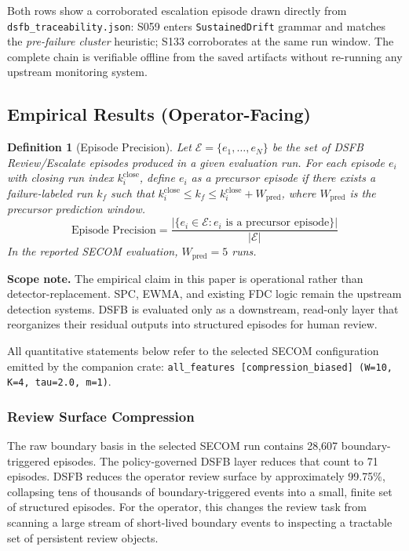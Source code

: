 \documentclass[11pt,letterpaper]{article}
\theoremstyle{scresult}
\newtheorem{definition}{Definition}
\begin{document}
\noindent Both rows show a corroborated escalation episode drawn directly
from \texttt{dsfb\_traceability.json}: S059
enters \texttt{SustainedDrift} grammar and matches the
\emph{pre-failure cluster} heuristic; S133 corroborates at the same run
window.
The complete chain is verifiable offline from the saved artifacts without
re-running any upstream monitoring system.

\subsection{Empirical Results (Operator-Facing)}

\begin{definition}[Episode Precision]
Let $\mathcal{E} = \{e_1, \ldots, e_N\}$ be the set of DSFB
Review/Escalate episodes produced in a given evaluation run. For each episode
$e_i$ with closing run index $k_i^{\text{close}}$, define $e_i$ as a
\emph{precursor episode} if there exists a failure-labeled run $k_f$ such that
$k_i^{\text{close}} \leq k_f \leq k_i^{\text{close}} + W_{\text{pred}}$, where
$W_{\text{pred}}$ is the precursor prediction window.
\[
  \text{Episode Precision} = \frac{|\{e_i \in \mathcal{E} : e_i \text{ is a precursor episode}\}|}{|\mathcal{E}|}
\]
In the reported SECOM evaluation, $W_{\text{pred}} = 5$ runs.
\end{definition}

\begin{tcolorbox}[warnbox]
\textbf{Scope note.} The empirical claim in this paper is operational rather
than detector-replacement. SPC, EWMA, and existing FDC logic remain the
upstream detection systems. DSFB is evaluated only as a downstream, read-only
layer that reorganizes their residual outputs into structured episodes for
human review.
\end{tcolorbox}

All quantitative statements below refer to the selected SECOM configuration
emitted by the companion crate:
\texttt{all\_features [compression\_biased] (W=10, K=4, tau=2.0, m=1)}.

\subsubsection{Review Surface Compression}

The raw boundary basis in the selected SECOM run contains 28{,}607
boundary-triggered episodes. The policy-governed DSFB layer reduces that count
to 71 episodes. DSFB reduces the operator review surface by approximately
99.75\%, collapsing tens of thousands of boundary-triggered events into a
small, finite set of structured episodes. For the operator, this changes the
review task from scanning a large stream of short-lived boundary events to
inspecting a tractable set of persistent review objects.
\end{document}
